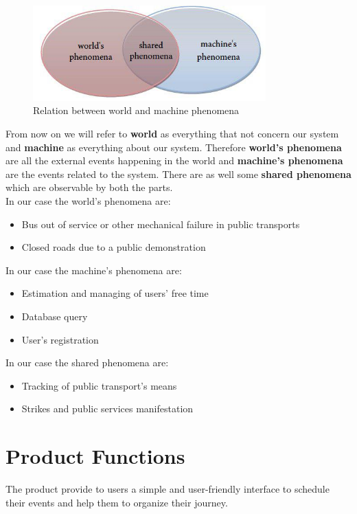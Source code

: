 \documentclass[numbers=noenddot, 12pt, a4paper, oneside]{scrbook}
\begin{document}
\begin{figure}[H]
	\centering
	\includegraphics[width=0.8\textwidth]{phenomena}
	\caption{Relation between world and machine phenomena}
\end{figure}

From now on we will refer to \textbf{world} as everything that not concern our system and \textbf{machine} as everything about our system. Therefore \textbf{world's phenomena} are all the external events happening in the world and \textbf{machine's phenomena} are the events related to the system. There are as well some \textbf{shared phenomena} which are observable by both the parts.\\

In our case the world's phenomena are:
\begin{itemize}
	\item Bus out of service or other mechanical failure in public transports
	\item Closed roads due to a public demonstration
\end{itemize}
In our case the machine's phenomena are:
\begin{itemize}
	\item Estimation and managing of users' free time 
	\item Database query
	\item User's registration
\end{itemize}
In our case the shared phenomena are:
\begin{itemize}
	\item Tracking of public transport's means
	\item Strikes and public services manifestation
\end{itemize}


\section{Product Functions}

The product provide to users a simple and user-friendly interface to schedule their events and help them to organize their journey.\\
\end{document}
